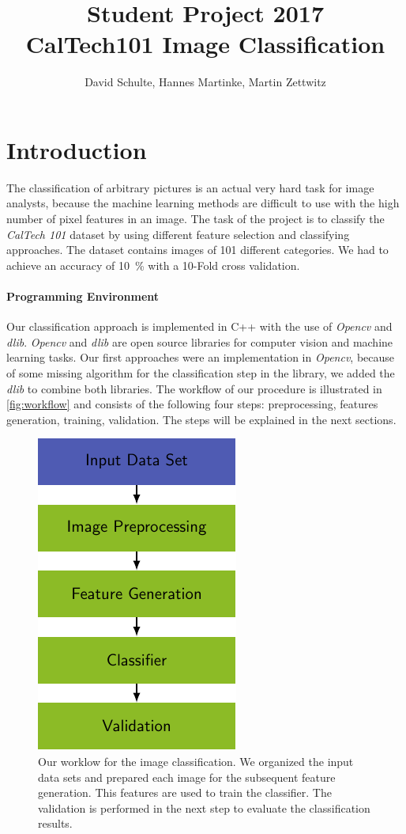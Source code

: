 \documentclass[a4paper,10pt]{article}
\title{ Student Project 2017 \\ CalTech101 Image Classification}
\author{David Schulte, Hannes Martinke, Martin Zettwitz}
\begin{document}
\maketitle

\section{Introduction}
The classification of arbitrary pictures is an actual very hard task for image analysts, because the machine learning methods are difficult to use with the high number of pixel features in an image.
The task of the project is to classify the \emph{CalTech 101} dataset by using different feature selection and classifying approaches. 
The dataset contains images of 101 different categories. We had to achieve an accuracy of 10~\% with a 10-Fold cross validation.

\paragraph{Programming Environment}
Our classification approach is implemented in C++ with the use of \emph{Opencv} and \emph{dlib}.
\emph{Opencv} and \emph{dlib} are open source libraries for computer vision and machine learning tasks. 
Our first approaches were an implementation in \emph{Opencv}, because of some missing algorithm for the classification step in the library, we added the \emph{dlib} to combine both libraries.
The workflow of our procedure is illustrated in \autoref{fig:workflow} and consists of the following four steps: preprocessing, features generation, training, validation.
The steps will be explained in the next sections.

\begin{figure}[htb]
\centering
\includegraphics[scale=0.7]{images/Workflow.pdf}
\caption{Our worklow for the image classification. We organized the input data sets and prepared each image for the subsequent feature generation.
This features are used to train the classifier. The validation is performed in the next step to evaluate the classification results.}
\label{fig:workflow}
\end{figure}
\end{document}
